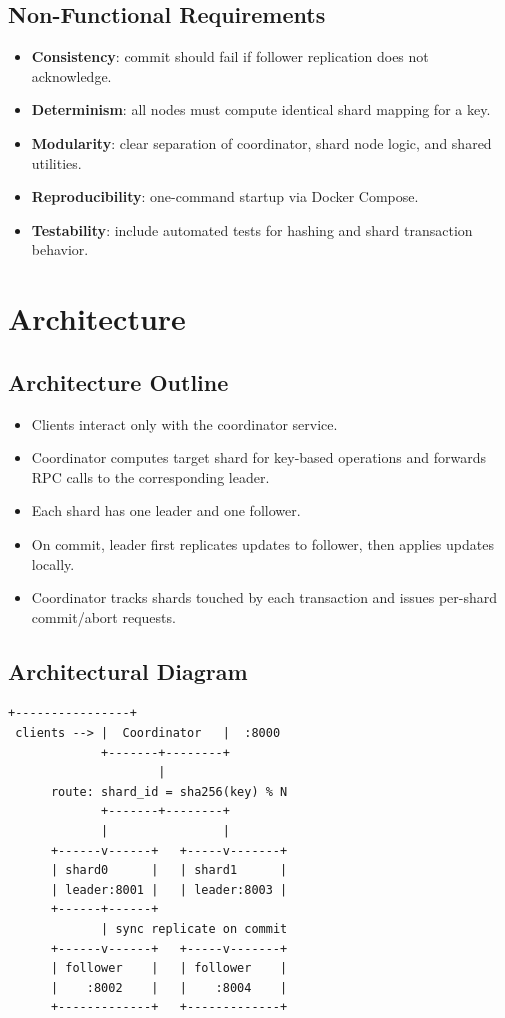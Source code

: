 \documentclass[11pt]{article}
\begin{document}
\subsection*{Non-Functional Requirements}
\begin{itemize}[leftmargin=1.2em]
    \item \textbf{Consistency}: commit should fail if follower replication does not acknowledge.
    \item \textbf{Determinism}: all nodes must compute identical shard mapping for a key.
    \item \textbf{Modularity}: clear separation of coordinator, shard node logic, and shared utilities.
    \item \textbf{Reproducibility}: one-command startup via Docker Compose.
    \item \textbf{Testability}: include automated tests for hashing and shard transaction behavior.
\end{itemize}

\section{Architecture}
\subsection*{Architecture Outline}
\begin{itemize}[leftmargin=1.2em]
    \item Clients interact only with the coordinator service.
    \item Coordinator computes target shard for key-based operations and forwards RPC calls to the corresponding leader.
    \item Each shard has one leader and one follower.
    \item On commit, leader first replicates updates to follower, then applies updates locally.
    \item Coordinator tracks shards touched by each transaction and issues per-shard commit/abort requests.
\end{itemize}

\subsection*{Architectural Diagram}
\begin{Verbatim}[fontsize=\small,frame=single]
             +----------------+
 clients --> |  Coordinator   |  :8000
             +-------+--------+
                     |
      route: shard_id = sha256(key) % N
             +-------+--------+
             |                |
      +------v------+   +-----v-------+
      | shard0      |   | shard1      |
      | leader:8001 |   | leader:8003 |
      +------+------+
             | sync replicate on commit
      +------v------+   +-----v-------+
      | follower    |   | follower    |
      |    :8002    |   |    :8004    |
      +-------------+   +-------------+
\end{Verbatim}
\end{document}

